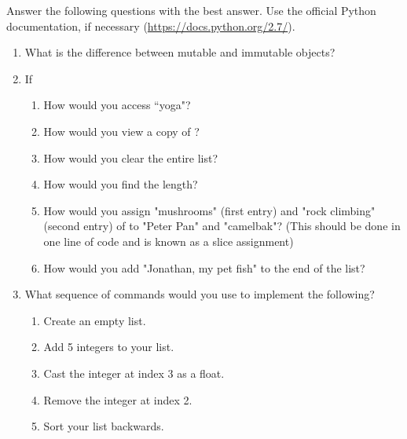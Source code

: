 \begin{problem}
Answer the following questions with the best answer. Use the official Python documentation, if necessary (\url{https://docs.python.org/2.7/}).

\begin{enumerate}

\item What is the difference between mutable and immutable objects?
\item If 
\begin{enumerate}

	\item How would you access ``yoga"? 
	\item How would you view a copy of ?
	\item How would you clear the entire list? 
	\item How would you find the length? 
	\item How would you assign "mushrooms" (first entry) and "rock climbing" (second entry) 
	of  to "Peter Pan" and "camelbak"? 
	(This should be done in one line of code and is known as a slice assignment)
	\item How would you add "Jonathan, my pet fish" to the end of the list?

\end{enumerate}
\item What sequence of commands would you use to implement the following?

\begin{enumerate}
\item Create an empty list. 
\item Add 5 integers to your list. 
\item Cast the integer at index 3 as a float.
\item Remove the integer at index 2. 
\item Sort your list backwards.

\end{enumerate}
\end{enumerate}
\end{problem}


